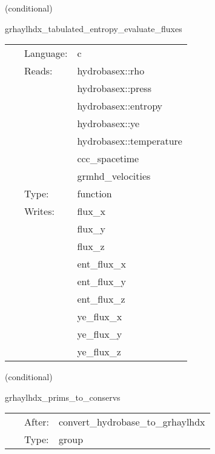 \vspace{5mm}

   (conditional) 

\hspace{5mm} grhaylhdx\_tabulated\_entropy\_evaluate\_fluxes 

\hspace{5mm}{\it entropy+tabulated version of grhaylhdx\_evaluate\_fluxes } 


\hspace{5mm}

 \begin{tabular*}{160mm}{cll} 
~ & Language:  & c \\ 
~ & Reads:  & hydrobasex::rho \\ 
~& ~ &hydrobasex::press\\ 
~& ~ &hydrobasex::entropy\\ 
~& ~ &hydrobasex::ye\\ 
~& ~ &hydrobasex::temperature\\ 
~& ~ &ccc\_spacetime\\ 
~& ~ &grmhd\_velocities\\ 
~ & Type:  & function \\ 
~ & Writes:  & flux\_x \\ 
~& ~ &flux\_y\\ 
~& ~ &flux\_z\\ 
~& ~ &ent\_flux\_x\\ 
~& ~ &ent\_flux\_y\\ 
~& ~ &ent\_flux\_z\\ 
~& ~ &ye\_flux\_x\\ 
~& ~ &ye\_flux\_y\\ 
~& ~ &ye\_flux\_z\\ 
\end{tabular*} 


\vspace{5mm}

   (conditional) 

\hspace{5mm} grhaylhdx\_prims\_to\_conservs 

\hspace{5mm}{\it enforce simulation limits on primitives and compute conservatives } 


\hspace{5mm}

 \begin{tabular*}{160mm}{cll} 
~ & After:  & convert\_hydrobase\_to\_grhaylhdx \\ 
~ & Type:  & group \\ 
\end{tabular*} 


